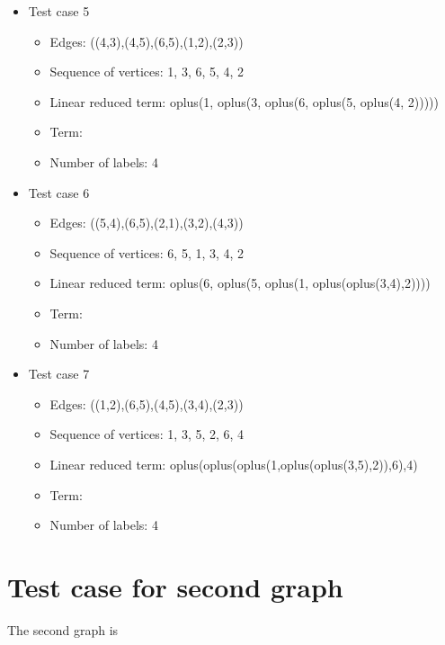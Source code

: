 \documentclass[a4paper, 12pt]{article}
\begin{document}
\begin{itemize}
\item Test case 5
	\begin{itemize}
		\item Edges: ((4,3),(4,5),(6,5),(1,2),(2,3))
		\item Sequence of vertices: 1, 3, 6, 5, 4, 2
		\item Linear reduced term: oplus(1, oplus(3, oplus(6, oplus(5, oplus(4, 2)))))
		\item Term: 
		\item Number of labels: 4
	\end{itemize}

\item Test case 6
	\begin{itemize}
		\item Edges: ((5,4),(6,5),(2,1),(3,2),(4,3))
		\item Sequence of vertices: 6, 5, 1, 3, 4, 2
		\item Linear reduced term: oplus(6, oplus(5, oplus(1, oplus(oplus(3,4),2))))
		\item Term: 
		\item Number of labels: 4
	\end{itemize}

\item Test case 7
	\begin{itemize}
		\item Edges: ((1,2),(6,5),(4,5),(3,4),(2,3))
		\item Sequence of vertices: 1, 3, 5, 2, 6, 4
		\item Linear reduced term: oplus(oplus(oplus(1,oplus(oplus(3,5),2)),6),4)
		\item Term: 
		\item Number of labels: 4
	\end{itemize}
\end{itemize}

\section{Test case for second graph}
The second graph is
\end{document}
